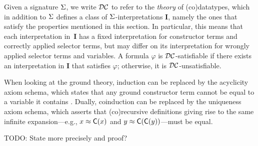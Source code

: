 
Given a signature $\mathrm{\Sigma}$, we write $\mathcal{DC}$ to refer to the \emph{theory} of (co)datatypes,
which in addition to $\mathrm{\Sigma}$ defines a class of $\mathrm{\Sigma}$-interpretations $\mathbf{I}$,
namely the ones that satisfy the %
properties mentioned in this section.
In particular, this means that each interpretation in~$\mathbf{I}$ has a fixed interpretation
for constructor terms and correctly applied selector terms, but may differ on its interpretation for
wrongly applied selector terms and variables.
A formula $\varphi$ is $\mathcal{DC}$-satisfiable if there exists an interpretation in $\mathbf{I}$ that satisfies $\varphi$;
otherwise, it is $\mathcal{DC}$-unsatisfiable.

When looking at the ground theory, induction can be replaced by the acyclicity
axiom schema, which states that any ground constructor term cannot be equal to
a variable it contains \cite{xxx}. Dually, coinduction can be replaced by the
uniqueness axiom schema, which asserts that (co)recursive definitions giving
rise to the same infinite expansion---e.g., $x \approx \textsf{C}(x)$ and $y \approx
\textsf{C}(\textsf{C}(y))$---must be equal.

\begin{report}
TODO: State more precisely and proof?
\end{report}



